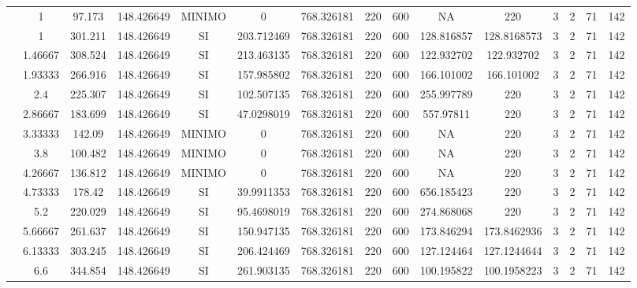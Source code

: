 \begin{table}[H]
{\begin{tabular}{|c|c|c|c|c|c|c|c|c|c|c|c|c|c|c|}
\cline{2-15}    & 1   & 97.173 & 148.426649 & MINIMO & 0   & 768.326181 & 220 & 600 & NA  & 220 & 3   & 2   & 71  & 142 \bigstrut\\
\cline{2-15}    & 1   & 301.211 & 148.426649 & SI  & 203.712469 & 768.326181 & 220 & 600 & 128.816857 & 128.8168573 & 3   & 2   & 71  & 142 \bigstrut\\
\cline{2-15}    & 1.46667 & 308.524 & 148.426649 & SI  & 213.463135 & 768.326181 & 220 & 600 & 122.932702 & 122.932702 & 3   & 2   & 71  & 142 \bigstrut\\
\cline{2-15}    & 1.93333 & 266.916 & 148.426649 & SI  & 157.985802 & 768.326181 & 220 & 600 & 166.101002 & 166.101002 & 3   & 2   & 71  & 142 \bigstrut\\
\cline{2-15}    & 2.4 & 225.307 & 148.426649 & SI  & 102.507135 & 768.326181 & 220 & 600 & 255.997789 & 220 & 3   & 2   & 71  & 142 \bigstrut\\
\cline{2-15}    & 2.86667 & 183.699 & 148.426649 & SI  & 47.0298019 & 768.326181 & 220 & 600 & 557.97811 & 220 & 3   & 2   & 71  & 142 \bigstrut\\
\cline{2-15}    & 3.33333 & 142.09 & 148.426649 & MINIMO & 0   & 768.326181 & 220 & 600 & NA  & 220 & 3   & 2   & 71  & 142 \bigstrut\\
\cline{2-15}    & 3.8 & 100.482 & 148.426649 & MINIMO & 0   & 768.326181 & 220 & 600 & NA  & 220 & 3   & 2   & 71  & 142 \bigstrut\\
\cline{2-15}    & 4.26667 & 136.812 & 148.426649 & MINIMO & 0   & 768.326181 & 220 & 600 & NA  & 220 & 3   & 2   & 71  & 142 \bigstrut\\
\cline{2-15}    & 4.73333 & 178.42 & 148.426649 & SI  & 39.9911353 & 768.326181 & 220 & 600 & 656.185423 & 220 & 3   & 2   & 71  & 142 \bigstrut\\
\cline{2-15}    & 5.2 & 220.029 & 148.426649 & SI  & 95.4698019 & 768.326181 & 220 & 600 & 274.868068 & 220 & 3   & 2   & 71  & 142 \bigstrut\\
\cline{2-15}    & 5.66667 & 261.637 & 148.426649 & SI  & 150.947135 & 768.326181 & 220 & 600 & 173.846294 & 173.8462936 & 3   & 2   & 71  & 142 \bigstrut\\
\cline{2-15}    & 6.13333 & 303.245 & 148.426649 & SI  & 206.424469 & 768.326181 & 220 & 600 & 127.124464 & 127.1244644 & 3   & 2   & 71  & 142 \bigstrut\\
\cline{2-15}    & 6.6 & 344.854 & 148.426649 & SI  & 261.903135 & 768.326181 & 220 & 600 & 100.195822 & 100.1958223 & 3   & 2   & 71  & 142 \bigstrut\\

\end{tabular}}
\end{table}
